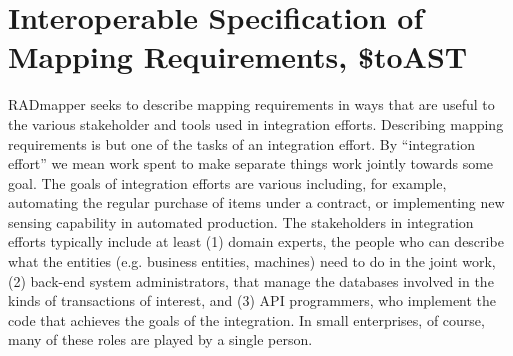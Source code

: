 \documentclass[10pt,letterpaper]{article} %
\begin{document}
\section{Interoperable Specification of Mapping Requirements, \$toAST}

RADmapper seeks to describe mapping requirements in ways that are useful to the various stakeholder and tools used in integration efforts.
Describing mapping requirements is but one of the tasks of an integration effort.
By ``integration effort'' we mean work spent to make separate things work jointly towards some goal.
The goals of integration efforts are various including, for example, automating the regular purchase of items under a contract, or implementing new sensing capability in automated production.
The stakeholders in integration efforts typically include at least
(1) domain experts, the people who can describe what the entities (e.g. business entities, machines) need to do in the joint work,
(2) back-end system administrators, that manage the databases involved in the kinds of transactions of interest, and
(3) API programmers, who implement the code that achieves the goals of the integration.
In small enterprises, of course, many of these roles are played by a single person.

%
\end{document}
